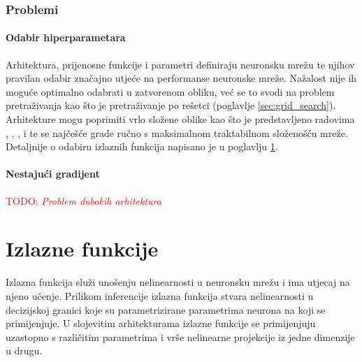 \documentclass[times, utf8, numeric, diplomski]{fer}
\def\secref#1{(poglavlje \ref{#1})}
\def\TODO#1{\noindent\textcolor{red}{TODO: \textit{#1}}\newline}
\def\todo#1{\TODO{#1}}
\begin{document}
\subsection{Problemi}
\subsubsection{Odabir hiperparametara}
Arhitektura, prijenosne funkcije i parametri definiraju neuronsku mrežu te njihov pravilan odabir značajno utjeće na performanse neuronske mreže. Nažalost nije ih moguće optimalno odabrati u zatvorenom obliku, već se to svodi na problem pretraživanja kao što je pretraživanje po rešetci \secref{sec:grid_search}. Arhitekture mogu poprimiti vrlo složene oblike kao što je predstavljeno radovima \citet{highwaynet}, \citet{resnet}, \citet{densenet}, \citet{inceptionnet} i \citet{yolo} te se najčešće grade ručno s maksimalnom traktabilnom složenošću mreže. Detaljnije o odabiru izlaznih funkcija napisano je u poglavlju \ref{sec:izlazne_fje}.

\subsubsection{Nestajući gradijent}
\label{sec:nestajući_grad}
\todo{Problem dubokih arhitektura}

%

\chapter{Izlazne funkcije}
\label{sec:izlazne_fje}
Izlazna funkcija služi unošenju nelinearnosti u neuronsku mrežu i ima utjecaj na njeno učenje. Prilikom inferencije izlazna funkcija stvara nelinearnosti u decizijskoj granici koje su parametrizirane parametrima neurona na koji se primijenjuje. U slojevitim arhitekturama izlazne funkcije se primijenjuju uzastopno s različitim parametrima i vrše nelinearne projekcije iz jedne dimenzije u drugu.
\end{document}
